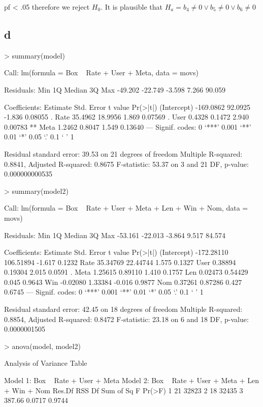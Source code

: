 \documentclass{article}
\begin{document}
pf < .05 therefore we reject $H_0$. It is plausible that $H_a=b_4\neq0 \lor b_5\neq0 \lor b_6\neq0$

\subsection*{d}
\begin{Schunk}
\begin{Sinput}
> summary(model)
\end{Sinput}
\begin{Soutput}
Call:
lm(formula = Box ~ Rate + User + Meta, data = movs)

Residuals:
    Min      1Q  Median      3Q     Max 
-49.202 -22.749  -3.598   7.266  90.059 

Coefficients:
             Estimate Std. Error t value Pr(>|t|)   
(Intercept) -169.0862    92.0925  -1.836  0.08055 . 
Rate          35.4962    18.9956   1.869  0.07569 . 
User           0.4328     0.1472   2.940  0.00783 **
Meta           1.2462     0.8047   1.549  0.13640   
---
Signif. codes:  0 ‘***’ 0.001 ‘**’ 0.01 ‘*’ 0.05 ‘.’ 0.1 ‘ ’ 1

Residual standard error: 39.53 on 21 degrees of freedom
Multiple R-squared:  0.8841,	Adjusted R-squared:  0.8675 
F-statistic: 53.37 on 3 and 21 DF,  p-value: 0.000000000535
\end{Soutput}
\begin{Sinput}
> summary(model2)
\end{Sinput}
\begin{Soutput}
Call:
lm(formula = Box ~ Rate + User + Meta + Len + Win + Nom, data = movs)

Residuals:
    Min      1Q  Median      3Q     Max 
-53.161 -22.013  -3.864   9.517  84.574 

Coefficients:
              Estimate Std. Error t value Pr(>|t|)  
(Intercept) -172.28110  106.51894  -1.617   0.1232  
Rate          35.34769   22.44744   1.575   0.1327  
User           0.38894    0.19304   2.015   0.0591 .
Meta           1.25615    0.89110   1.410   0.1757  
Len            0.02473    0.54429   0.045   0.9643  
Win           -0.02080    1.33384  -0.016   0.9877  
Nom            0.37261    0.87286   0.427   0.6745  
---
Signif. codes:  0 ‘***’ 0.001 ‘**’ 0.01 ‘*’ 0.05 ‘.’ 0.1 ‘ ’ 1

Residual standard error: 42.45 on 18 degrees of freedom
Multiple R-squared:  0.8854,	Adjusted R-squared:  0.8472 
F-statistic: 23.18 on 6 and 18 DF,  p-value: 0.0000001505
\end{Soutput}
\begin{Sinput}
> anova(model, model2)
\end{Sinput}
\begin{Soutput}
Analysis of Variance Table

Model 1: Box ~ Rate + User + Meta
Model 2: Box ~ Rate + User + Meta + Len + Win + Nom
  Res.Df   RSS Df Sum of Sq      F Pr(>F)
1     21 32823                           
2     18 32435  3    387.66 0.0717 0.9744
\end{Soutput}
\end{Schunk}
\end{document}
